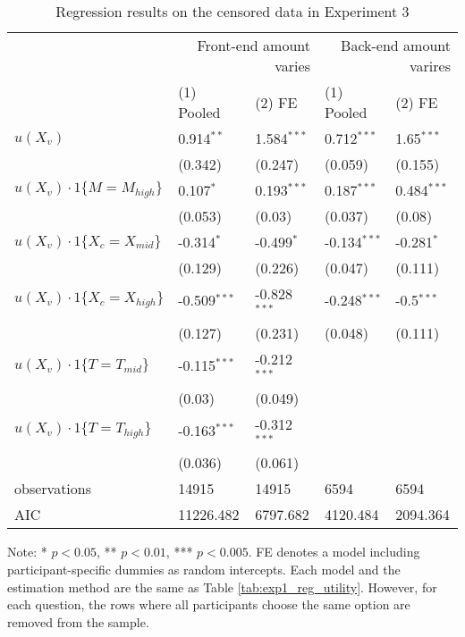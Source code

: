 \documentclass[12pt]{article}
\begin{document}
\begin{table}
    \caption{Regression results on the censored data in Experiment 3}
    \vspace*{12pt}
    \centering

      \begin{tabular}{lllll}
\hline
 & \multicolumn{2}{r}{Front-end amount varies} & \multicolumn{2}{r}{Back-end amount varires} \\
 & (1) Pooled & (2) FE & (1) Pooled & (2) FE \\
\hline
$u(X_v)$ & 0.914$^{**}$ & 1.584$^{***}$ & 0.712$^{***}$ & 1.65$^{***}$ \\
 & (0.342) & (0.247) & (0.059) & (0.155) \\
$u(X_v)\cdot1\{M=M_{high}\}$ & 0.107$^{*}$ & 0.193$^{***}$ & 0.187$^{***}$ & 0.484$^{***}$ \\
 & (0.053) & (0.03) & (0.037) & (0.08) \\
$u(X_v)\cdot1\{X_c=X_{mid}\}$ & -0.314$^{*}$ & -0.499$^{*}$ & -0.134$^{***}$ & -0.281$^{*}$ \\
 & (0.129) & (0.226) & (0.047) & (0.111) \\
$u(X_v)\cdot1\{X_c=X_{high}\}$ & -0.509$^{***}$ & -0.828$^{***}$ & -0.248$^{***}$ & -0.5$^{***}$ \\
 & (0.127) & (0.231) & (0.048) & (0.111) \\
$u(X_v)\cdot1\{T=T_{mid}\}$ & -0.115$^{***}$ & -0.212$^{***}$ &  &  \\
 & (0.03) & (0.049) &  &  \\
$u(X_v)\cdot1\{T=T_{high}\}$ & -0.163$^{***}$ & -0.312$^{***}$ &  &  \\
 & (0.036) & (0.061) &  &  \\\hline

observations & 14915 & 14915 & 6594 & 6594 \\
AIC & 11226.482 & 6797.682 & 4120.484 & 2094.364 \\
\hline
\end{tabular}

    \vspace*{4pt}
    \centering
    \begin{minipage}{0.9\textwidth}
    {\par\footnotesize Note: * $p<0.05$, ** $p<0.01$, *** $p<0.005$. FE denotes a model including participant-specific dummies as random intercepts. Each model and the estimation method are the same as Table \ref{tab:exp1_reg_utility}. However, for each question, the rows where all participants choose the same option are removed from the sample. }
    \end{minipage}
    \label{tab:exp1_reg_censor}
\end{table}
\end{document}
